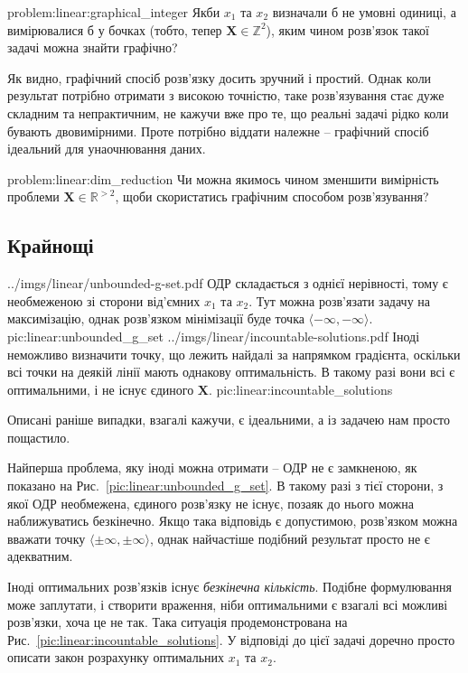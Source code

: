 \documentclass[\main/book.tex]{subfiles}
\begin{document}
\begin{problem}{problem:linear:graphical_integer}
 Якби $x_1$ та $x_2$ визначали б не умовні одиниці, а вимірювалися б у бочках (тобто, тепер $\mathbf{X} \in \mathbb{Z}^2$), яким чином розв'язок такої задачі можна знайти графічно?
\end{problem}

Як видно, графічний спосіб розв'язку досить зручний і простий. Однак коли результат потрібно отримати з високою точністю, таке роз\-в'я\-зу\-ван\-ня стає дуже складним та непрактичним, не кажучи вже про те, що реальні задачі рідко коли бувають двовимірними. Проте потрібно віддати належне -- графічний спосіб ідеальний для унаочнювання даних.

\begin{problem}{problem:linear:dim_reduction}
 Чи можна якимось чином зменшити вимірність проблеми ${\mathbf{X} \in \mathbb{R}^{> 2}}$, щоби скористатись графічним способом розв'язування?
\end{problem}


\subsection{Крайнощі}

\twocolminipage
 {
  \nofigillustration
   {../imgs/linear/unbounded-g-set.pdf}
   {ОДР складається з однієї нерівності, тому є необмеженою зі сторони від'ємних $x_1$ та $x_2$. Тут можна розв'язати задачу на максимізацію, однак розв'язком мінімізації буде точка ${\langle -\infty, -\infty \rangle}$.}
   {pic:linear:unbounded_g_set}
 }{
  \nofigillustration
   {../imgs/linear/incountable-solutions.pdf}
   {Іноді неможливо визначити точку, що лежить найдалі за напрямком градієнта, оскільки всі точки на деякій лінії мають однакову оптимальність. В такому разі вони всі є оптимальними, і не існує єдиного $\mathbf{X}$.}
   {pic:linear:incountable_solutions}
 }

Описані раніше випадки, взагалі кажучи, є ідеальними, а із задачею нам просто пощастило.

Найперша проблема, яку іноді можна отримати -- ОДР не є замкненою, як показано на Рис.~\ref{pic:linear:unbounded_g_set}. В такому разі з тієї сторони, з якої ОДР необмежена, єдиного розв'язку не існує, позаяк до нього можна наближуватись безкінечно. Якщо така відповідь є допустимою, розв'язком можна вважати точку ${\langle \pm \infty, \pm \infty \rangle}$, однак найчастіше подібний результат просто не є адекватним.

Іноді оптимальних розв'язків існує \textit{безкінечна кількість}. Подібне формулювання може заплутати, і створити враження, ніби оптимальними є взагалі всі можливі розв'язки, хоча це не так. Така ситуація продемонстрована на Рис.~\ref{pic:linear:incountable_solutions}. У відповіді до цієї задачі доречно просто описати закон розрахунку оптимальних $x_1$ та $x_2$.
\end{document}

